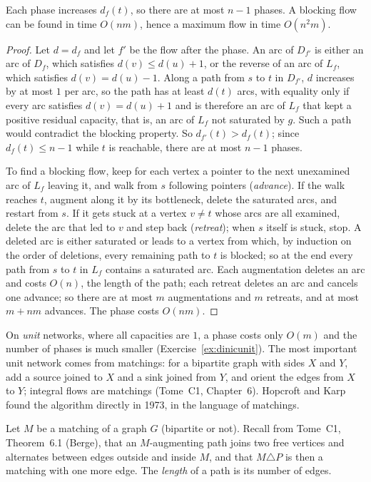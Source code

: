 \begin{theorem}[Dinic, 1970]\label{thm:dinic}
Each phase increases $d_f(t)$, so there are at most $n-1$ phases. A blocking flow can be found in time $O(nm)$, hence a maximum flow in time $O(n^2m)$.
\end{theorem}
\begin{proof}
Let $d=d_f$ and let $f'$ be the flow after the phase. An arc of $D_{f'}$ is either an arc of $D_f$, which satisfies $d(v)\le d(u)+1$, or the reverse of an arc of $L_f$, which satisfies $d(v)=d(u)-1$. Along a path from $s$ to $t$ in $D_{f'}$,
$d$ increases by at most $1$ per arc, so the path has at least $d(t)$ arcs, with equality only if every arc satisfies $d(v)=d(u)+1$ and is therefore an arc of $L_f$ that kept a positive residual capacity, that is, an arc of $L_f$ not saturated by $g$.
Such a path would contradict the blocking property. So $d_{f'}(t)>d_f(t)$; since $d_f(t)\le n-1$ while $t$ is reachable, there are at most $n-1$ phases.

To find a blocking flow, keep for each vertex a pointer to the next unexamined arc of $L_f$ leaving it, and walk from $s$ following pointers (\emph{advance}). If the walk reaches $t$, augment along it by its bottleneck,
delete the saturated arcs, and restart from $s$. If it gets stuck at a vertex $v\ne t$ whose arcs are all examined, delete the arc that led to $v$ and step back (\emph{retreat}); when $s$ itself is stuck, stop. A deleted arc is either saturated
or leads to a vertex from which, by induction on the order of deletions, every remaining path to $t$ is blocked; so at the end every path from $s$ to $t$ in $L_f$ contains a saturated arc. Each augmentation deletes an arc and costs $O(n)$, the length
of the path; each retreat deletes an arc and cancels one advance; so there are at most $m$ augmentations and $m$ retreats, and at most $m+nm$ advances. The phase costs $O(nm)$.
\end{proof}

On \emph{unit} networks, where all capacities are $1$, a phase costs only $O(m)$ and the number of phases is much smaller (Exercise~\ref{ex:dinicunit}). The most important unit network comes from matchings: for a bipartite graph with sides $X$ and $Y$,
add a source joined to $X$ and a sink joined from $Y$, and orient the edges from $X$ to $Y$; integral flows are matchings (Tome~C1, Chapter~6). Hopcroft and Karp found the algorithm directly in 1973, in the language of matchings.

Let $M$ be a matching of a graph $G$ (bipartite or not). Recall from Tome~C1, Theorem~6.1 (Berge), that an $M$-augmenting path joins two free vertices and alternates between edges outside and inside $M$, and that $M\triangle P$ is then a matching
with one more edge. The \emph{length} of a path is its number of edges.

